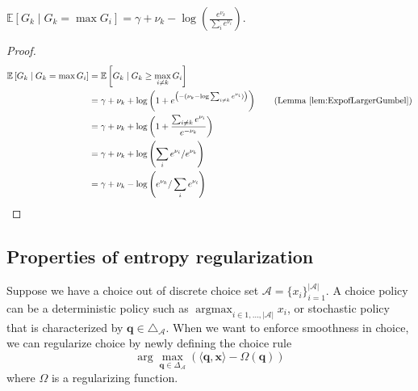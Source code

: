 \begin{cor}\label{cor:GumbelMaxasProb} $ \mathbb{E}\left[G_k \mid G_k = \max G_i\right] = \gamma + \nu_k - \log \left(\frac{e^{\nu_k}}{\sum_{i} e^{\nu_i}}\right)$. 
\end{cor}
\begin{proof}

\begin{align}
    \mathbb{E}\left[G_k \mid G_k = \max G_i\right] &= \mathbb{E}\left[G_k \mid G_k \geq \max_{i\neq k} G_i\right]\notag
    \\
    &=\gamma + \nu_k + \log \left( 1+ e^{\left(-(\nu_k-\log\sum_{i\neq k} e^{\nu_i})\right)}\right)\tag{Lemma \ref{lem:ExpofLargerGumbel}}
    \\
    &=\gamma + \nu_k + \log \left( 1+ \frac{\sum_{i\neq k} e^{\nu_i}}{e^{-\nu_k}}\right) \notag
    \\
    &=\gamma + \nu_k + \log \left(\sum_{i} e^{\nu_i}/e^{\nu_k} \right)\notag
    \\
    &=\gamma + \nu_k -\log \left(e^{\nu_k} / \sum_{i} e^{\nu_i} \right)\notag
\end{align}

\end{proof}


\subsection{Properties of entropy regularization}
Suppose we have a choice out of discrete choice set $\mathcal{A} = \{x_i\}_{i=1}^{|\mathcal{A}|}$. A choice policy can be a deterministic policy such as $\operatorname{argmax}_{i \in 1, \ldots, |\mathcal{A}|} x_i$, or stochastic policy that is characterized by $\mathbf{q}\in \triangle_{\mathcal{A}}$. When we want to enforce smoothness in choice, we can regularize choice by newly defining the choice rule 
$$\arg\max _{\mathbf{q} \in \Delta_{\mathcal{A}}}\left(\langle\mathbf{q}, \mathbf{x}\rangle-\Omega(\mathbf{q})\right)$$
where $\Omega$ is a regularizing function. 

